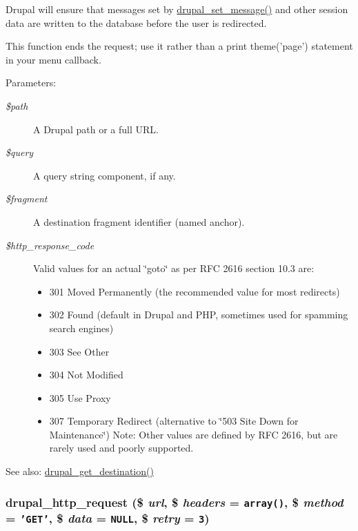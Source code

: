 Drupal will ensure that messages set by \hyperlink{bootstrap_8inc_d9223d86c7b08b1288274ce211d9bfa6}{drupal\_\-set\_\-message()} and other session data are written to the database before the user is redirected.

This function ends the request; use it rather than a print theme('page') statement in your menu callback.

\begin{Desc}
\item[Parameters:]
\begin{description}
\item[{\em \$path}]A Drupal path or a full URL. \item[{\em \$query}]A query string component, if any. \item[{\em \$fragment}]A destination fragment identifier (named anchor). \item[{\em \$http\_\-response\_\-code}]Valid values for an actual \char`\"{}goto\char`\"{} as per RFC 2616 section 10.3 are:\begin{itemize}
\item 301 Moved Permanently (the recommended value for most redirects)\item 302 Found (default in Drupal and PHP, sometimes used for spamming search engines)\item 303 See Other\item 304 Not Modified\item 305 Use Proxy\item 307 Temporary Redirect (alternative to \char`\"{}503 Site Down for Maintenance\char`\"{}) Note: Other values are defined by RFC 2616, but are rarely used and poorly supported. \end{itemize}
\end{description}
\end{Desc}
\begin{Desc}
\item[See also:]\hyperlink{common_8inc_0c95c16e75ac4df882686daccc1f8ac5}{drupal\_\-get\_\-destination()} \end{Desc}
\hypertarget{common_8inc_7577e13ffd5887ab484be2e95aca08d9}{
\subsubsection[{drupal\_\-http\_\-request}]{\setlength{\rightskip}{0pt plus 5cm}drupal\_\-http\_\-request (\$ {\em url}, \/  \$ {\em headers} = {\tt array()}, \/  \$ {\em method} = {\tt 'GET'}, \/  \$ {\em data} = {\tt NULL}, \/  \$ {\em retry} = {\tt 3})}}
\label{common_8inc_7577e13ffd5887ab484be2e95aca08d9}


